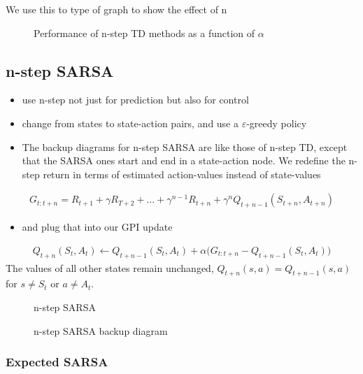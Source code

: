 \documentclass[sutton_barto_notes.tex]{subfiles}
\begin{document}
We use this to type of graph to show the effect of n

\begin{figure}[h!]
    \centering
    \caption{ Performance of n-step TD methods as a function of $\alpha$ }
\end{figure}

\newpage
\subsection{n-step SARSA}

\begin{itemize}
\item use n-step not just for prediction but also for control
\item change from states to state-action pairs, and use a $\varepsilon$-greedy policy
\item The backup diagrams for n-step SARSA are like those of n-step TD, except that the SARSA ones start and end in a state-action node.
We redefine the n-step return in terms of estimated action-values instead of state-values
\end{itemize}
\begin{align}
G_{t:t+n} = R_{t+1} + \gamma R_{T+2} + ... + \gamma^{n-1} R_{t+n} + \gamma^n Q_{t+n-1}(S_{t+n}, A_{t+n}) \label{eq:7.6}\tag{7.6}
\end{align}
\begin{itemize}
\item and plug that into our GPI update
\end{itemize}
\begin{align}
Q_{t+n}(S_t, A_t) \gets Q_{t+n-1}(S_t, A_t)  + \alpha \big(G_{t:t+n} - Q_{t+n-1}(S_t, A_t)\big) \label{eq:7.7}\tag{7.7}
\end{align}
The values of all other states remain unchanged, $Q_{t+n}(s,a) = Q_{t+n-1}(s,a)$ for $s \neq S_t$ or $a \neq A_t$.

\begin{figure}[h!]
    \centering
    \caption{ n-step SARSA }
\end{figure}
\begin{figure}[h!]
    \centering
    \caption{ n-step SARSA backup diagram }
\end{figure}

\subsubsection{Expected SARSA}
\end{document}
